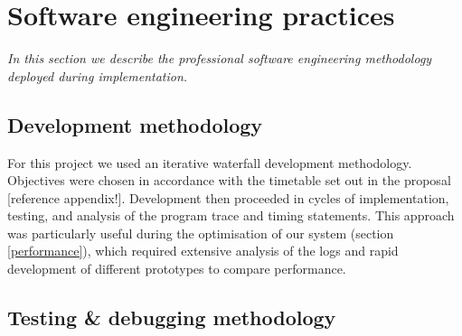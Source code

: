 

\section{Software engineering practices} \label{softwareeng}

\textit{In this section we describe the professional software engineering methodology deployed during implementation.}

\subsection{Development methodology} \label{devmethods}

For this project we used an iterative waterfall development methodology. Objectives were chosen in accordance with the timetable set out in the proposal [reference appendix!]. Development then proceeded in cycles of implementation, testing, and analysis of the program trace and timing statements. This approach was particularly useful during the optimisation of our system (section \ref{performance}), which required extensive analysis of the logs and rapid development of different prototypes to compare performance.

\subsection{Testing \& debugging methodology} \label{testing}

